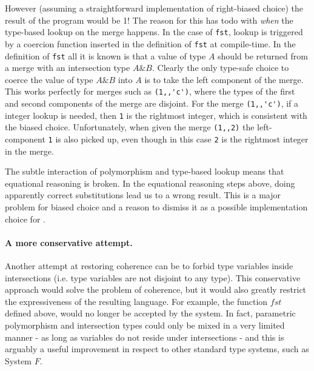 However (assuming a straightforward implementation of right-biased
choice) the result of the program would be 1! The reason for this has
todo with \emph{when} the type-based lookup on the merge happens. In
the case of \lstinline{fst}, lookup is triggered by a coercion
function inserted in the definition of \lstinline{fst} at
compile-time.
In the definition of \lstinline$fst$ all it is known is that a
value of type $A$ should be returned from a merge with an intersection
type $A\&B$.  
Clearly the only type-safe choice to coerce the value of type $A\&B$ into $A$ is to
take the left component of the merge. 
This works perfectly for merges
such as \lstinline$(1,,'c')$, where the types of the first and second components
of the merge are disjoint. 
For the merge \lstinline$(1,,'c')$, if a integer lookup
is needed, then \lstinline$1$ is the rightmost integer, which is consistent with the
biased choice. 
Unfortunately, when given the merge \lstinline$(1,,2)$ the
left-component \lstinline$1$ is also picked up, even though in this case \lstinline$2$
is the rightmost integer in the merge. 

The subtle interaction of polymorphism and type-based lookup
means that equational reasoning is broken.
In the equational reasoning steps above, doing apparently correct
substitutions lead us to a wrong result. 
This is a major problem for biased choice and a reason to dismiss it as a possible implementation
choice for \name.

\paragraph{A more conservative attempt.}
Another attempt at restoring coherence can be to forbid type variables inside
intersections (i.e. type variables are not disjoint to any type).
This conservative approach would solve the problem of coherence, but it would also greatly 
restrict the expressiveness of the resulting language.
For example, the function $fst$ defined above, would no longer be accepted by the system.
In fact, parametric polymorphism and intersection types could only be mixed in a very limited manner -
as long as variables do not reside under intersections - and this is arguably a useful improvement
in respect to other standard type systems, such as System $F$.

\begin{comment}
\subsection{Disjoint Polymorphism}
A more liberal solution,which enables the combination of type
variables and intersection types, is disjoint polymorphism.
Disjoint polymorphism assign constraints to each type variable, which
allows delaying the check for disjointness until type application/instantiation. 
\end{comment}

